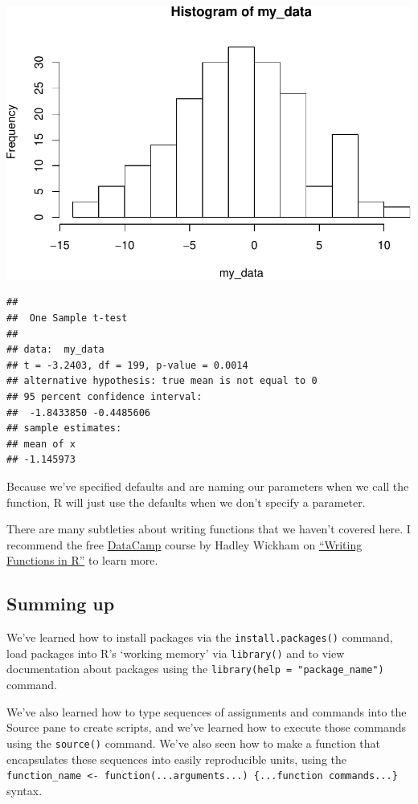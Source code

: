 \documentclass[]{article}
\begin{document}
\includegraphics{slow-r_files/figure-latex/unnamed-chunk-54-3.pdf}

\begin{verbatim}
## 
##  One Sample t-test
## 
## data:  my_data
## t = -3.2403, df = 199, p-value = 0.0014
## alternative hypothesis: true mean is not equal to 0
## 95 percent confidence interval:
##  -1.8433850 -0.4485606
## sample estimates:
## mean of x 
## -1.145973
\end{verbatim}

Because we've specified defaults and are naming our parameters when we
call the function, R will just use the defaults when we don't specify a
parameter.

There are many subtleties about writing functions that we haven't
covered here. I recommend the free
\href{http://www.datacamp.com}{DataCamp} course by Hadley Wickham on
\href{https://www.datacamp.com/courses/writing-functions-in-r}{``Writing
Functions in R''} to learn more.

\subsection{Summing up}\label{summing-up-2}

We've learned how to install packages via the
\texttt{install.packages()} command, load packages into R's `working
memory' via \texttt{library()} and to view documentation about packages
using the \texttt{library(help\ =\ "package\_name")} command.

We've also learned how to type sequences of assignments and commands
into the Source pane to create scripts, and we've learned how to execute
those commands using the \texttt{source()} command. We've also seen how
to make a function that encapsulates these sequences into easily
reproducible units, using the
\texttt{function\_name\ \textless{}-\ function(...arguments...)\ \{...function\ commands...\}}
syntax.
\end{document}

